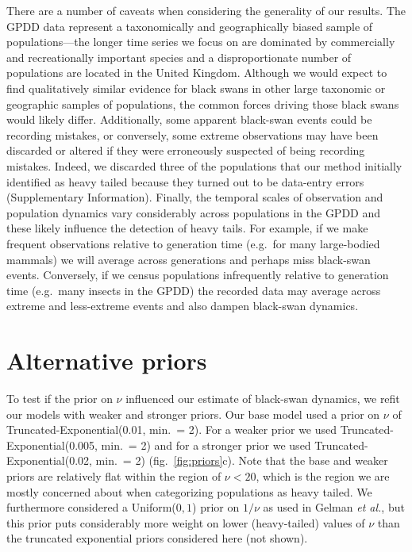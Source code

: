 \documentclass[12pt]{article}
\begin{document}
There are a number of caveats when considering the generality of our results. The GPDD data represent a taxonomically and geographically biased sample of populations---the longer time series we focus on are dominated by commercially and recreationally important species and a disproportionate number of populations are located in the United Kingdom. Although we would expect to find qualitatively similar evidence for black swans in other large taxonomic or geographic samples of populations, the common forces driving those black swans would likely differ. Additionally, some apparent black-swan events could be recording mistakes, or conversely, some extreme observations may have been discarded or altered if they were erroneously suspected of being recording mistakes. Indeed, we discarded three of the populations that our method initially identified as heavy tailed because they turned out to be data-entry errors (Supplementary Information). Finally, the temporal scales of observation and population dynamics vary considerably across populations in the GPDD and these likely influence the detection of heavy tails. For example, if we make frequent observations relative to generation time (e.g.~for many large-bodied mammals) we will average across generations and perhaps miss black-swan events. Conversely, if we census populations infrequently relative to generation time (e.g.~many insects in the GPDD) the recorded data may average across extreme and less-extreme events and also dampen black-swan dynamics.

\section{Alternative priors} To test if the prior on \(\nu\) influenced our estimate of black-swan dynamics, we refit our models with weaker and stronger priors. Our base model used a prior on \(\nu\) of Truncated-Exponential(0.01, min.\ = 2). For a weaker prior we used Truncated-Exponential(0.005, min.\ = 2) and for a stronger prior we used Truncated-Exponential(0.02, min.\ = 2) (fig.~\ref{fig:priors}c). Note that the base and weaker priors are relatively flat within the region of \(\nu < 20\), which is the region we are mostly concerned about when categorizing populations as heavy tailed. We furthermore considered a Uniform(\(0, 1\)) prior on \(1/\nu\) as used in Gelman \emph{et al.}\cite{gelman2014}, but this prior puts considerably more weight on lower (heavy-tailed) values of \(\nu\) than the truncated exponential priors considered here (not shown).
\end{document}
